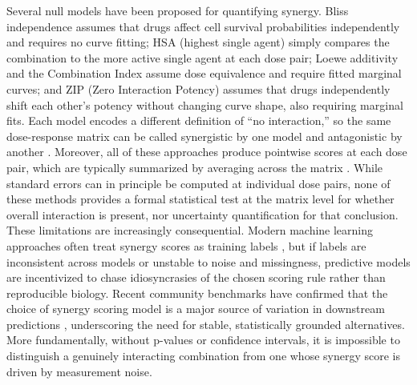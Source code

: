 \documentclass[unnumsec,webpdf,contemporary,large]{oup-authoring-template}
\begin{document}
Several null models have been proposed for quantifying synergy.
Bliss independence \cite{Bliss1939} assumes that drugs affect cell survival probabilities independently and requires no curve fitting;
HSA (highest single agent) simply compares the combination to the more active single agent at each dose pair;
Loewe additivity \cite{Loewe1926,Tallarida2006} and the Combination Index \cite{Chou1984} assume dose equivalence and require fitted marginal curves;
and ZIP (Zero Interaction Potency) \cite{Yadav2015,SynergyFinder2017,SynergyFinder2022,DiVeroli2016} assumes that drugs independently shift each other's potency without changing curve shape, also requiring marginal fits.
Each model encodes a different definition of ``no interaction,'' so the same dose-response matrix can be called synergistic by one model and antagonistic by another \cite{Berenbaum1989,Greco1995,Foucquier2015,Meyer2020,Vlot2019}.
Moreover, all of these approaches produce pointwise scores at each dose pair, which are typically summarized by averaging across the matrix \cite{SynergyFinder2017,SynergyFinder2022}.
While standard errors can in principle be computed at individual dose pairs, none of these methods provides a formal statistical test at the matrix level for whether overall interaction is present, nor uncertainty quantification for that conclusion.
These limitations are increasingly consequential.
Modern machine learning approaches often treat synergy scores as training labels \cite{DeepSynergy2018,Kuenzi2020,Menden2019}, but if labels are inconsistent across models or unstable to noise and missingness, predictive models are incentivized to chase idiosyncrasies of the chosen scoring rule rather than reproducible biology.
Recent community benchmarks have confirmed that the choice of synergy scoring model is a major source of variation in downstream predictions \cite{Menden2019}, underscoring the need for stable, statistically grounded alternatives.
More fundamentally, without p-values or confidence intervals, it is impossible to distinguish a genuinely interacting combination from one whose synergy score is driven by measurement noise.
\end{document}

